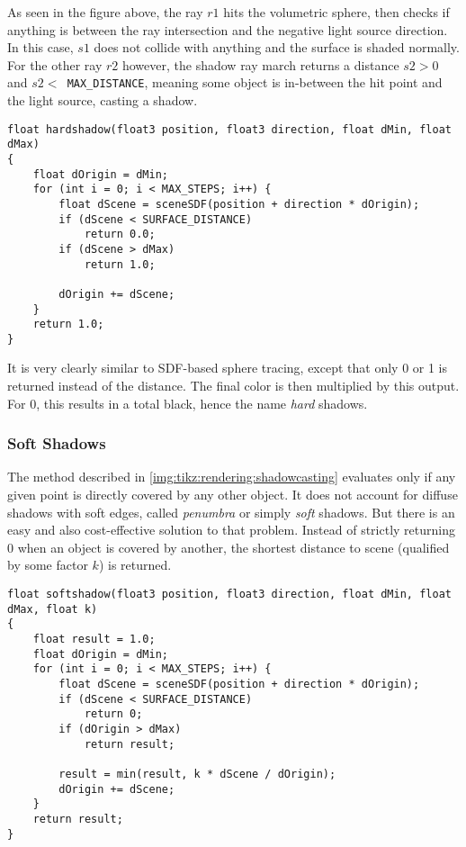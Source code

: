 \noindent
As seen in the figure above, the ray $r1$ hits the volumetric sphere, then checks if anything is between the ray intersection and the negative light source direction.
In this case, $s1$ does not collide with anything and the surface is shaded normally. 
For the other ray $r2$ however, the shadow ray march returns a distance $s2 > 0$ and $s2 < $\lstinline[language=HLSL]{ MAX_DISTANCE}, meaning some object is in-between the hit point and the light source, casting a shadow.
\\
\begin{lstlisting}[language=HLSL, caption=Implementation of hard shadow casting., label=lst:shader:shadowcasting:hard]
float hardshadow(float3 position, float3 direction, float dMin, float dMax)
{
    float dOrigin = dMin;
    for (int i = 0; i < MAX_STEPS; i++) {
        float dScene = sceneSDF(position + direction * dOrigin);
        if (dScene < SURFACE_DISTANCE)
            return 0.0;
        if (dScene > dMax)
            return 1.0;
        
        dOrigin += dScene;
    }
    return 1.0;
}
\end{lstlisting}

\noindent
It is very clearly similar to SDF-based sphere tracing, except that only 0 or 1 is returned instead of the distance.
The final color is then multiplied by this output. For 0, this results in a total black, hence the name \textit{hard} shadows.

\subsubsection{Soft Shadows}
The method described in \autoref{img:tikz:rendering:shadowcasting} evaluates only if any given point is directly covered by any other object. 
It does not account for diffuse shadows with soft edges, called \textit{\gls{penumbra}} or simply \textit{soft} shadows. But there is an easy and also cost-effective solution to that problem.
Instead of strictly returning 0 when an object is covered by another, the shortest distance to scene (qualified by some factor $k$) is returned.

\begin{lstlisting}[language=HLSL, caption=Implementation of hard shadow casting., label=lst:shader:shadowcasting:soft]
float softshadow(float3 position, float3 direction, float dMin, float dMax, float k)
{
    float result = 1.0;
    float dOrigin = dMin;
    for (int i = 0; i < MAX_STEPS; i++) {
        float dScene = sceneSDF(position + direction * dOrigin);
        if (dScene < SURFACE_DISTANCE)
            return 0;
        if (dOrigin > dMax)
            return result;
        
        result = min(result, k * dScene / dOrigin);
        dOrigin += dScene;
    }
    return result;
}
\end{lstlisting}

